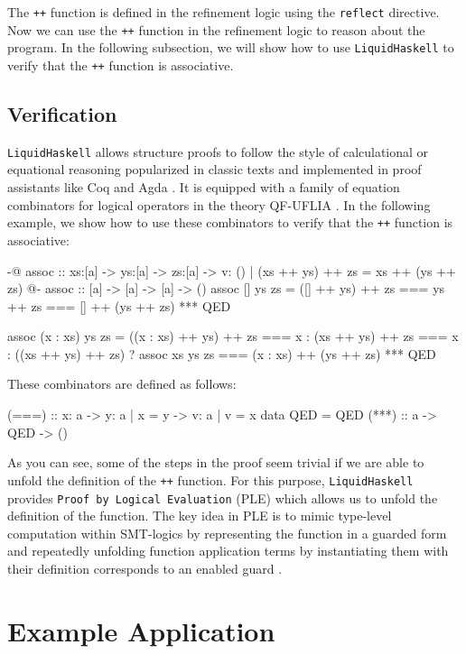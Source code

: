\documentclass[]{rptuseminar}
\begin{document}
The \texttt{++} function is defined in the refinement logic using the \texttt{reflect} directive.
Now we can use the \texttt{++} function in the refinement logic to reason about the program.
In the following subsection, we will show how to use \texttt{LiquidHaskell} to verify that  the \texttt{++} function is associative.

\subsection{Verification}
\texttt{LiquidHaskell} allows structure proofs to follow the style of calculational or equational reasoning popularized in classic texts
and implemented in proof assistants like Coq and Agda . It is equipped with a family of equation combinators
for logical operators in the theory QF-UFLIA \cite{vazou_refinement_2018}.
In the following example, we show how to use these combinators to verify that the \texttt{++} function is associative:

\begin{haskell}
{-@ assoc :: xs:[a] -> ys:[a] -> zs:[a] 
  -> { v: () | (xs ++ ys) ++ zs = xs ++ (ys ++ zs) } @-}
assoc :: [a] -> [a] -> [a] -> ()
assoc [] ys zs =
  ([] ++ ys)
    ++ zs
    === ys
    ++ zs
    === []
    ++ (ys ++ zs)
    *** QED

assoc (x : xs) ys zs =
  ((x : xs) ++ ys)
    ++ zs
    ===  x : (xs ++ ys) ++ zs
    === x
    : ((xs ++ ys) ++ zs)
      ? assoc xs ys zs
      === (x : xs)
      ++ (ys ++ zs)
      *** QED
\end{haskell}

These combinators are defined as follows:
\begin{haskell}
  (===) :: x: a -> y: { a | x = y }  -> { v: a | v = x }
  data QED = QED
  (***) :: a -> QED -> ()
\end{haskell}

As you can see, some of the steps in the proof seem trivial if we are able to unfold the definition of the \texttt{++} function.
For this purpose, \texttt{LiquidHaskell} provides \texttt{Proof by Logical Evaluation} (PLE) which allows us to unfold the definition of the function.
The key idea in PLE is to mimic type-level computation within SMT-logics by representing the function in a guarded form and repeatedly unfolding function
application terms by instantiating them with their definition corresponds to an enabled guard \cite{vazou_refinement_2018}.

\section{Example Application}
\label{sec:example}
\end{document}
